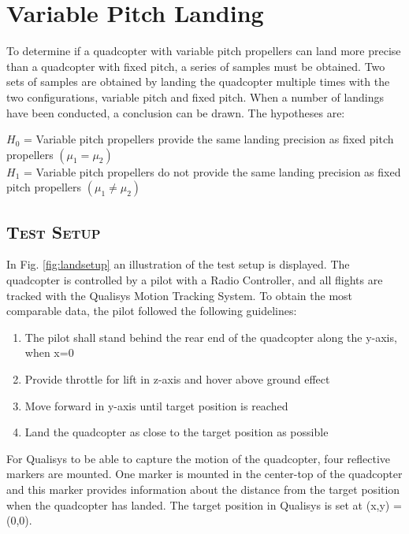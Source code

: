 \section{Variable Pitch Landing}
\label{sec:landtest}
To determine if a quadcopter with variable pitch propellers can land more precise than a quadcopter with fixed pitch, a series of samples must be obtained. Two sets of samples are obtained by landing the quadcopter multiple times with the two configurations, variable pitch and fixed pitch. When a number of landings have been conducted, a conclusion can be drawn. The hypotheses are:\bigskip

$H_0$ = Variable pitch propellers provide the same landing precision as fixed pitch propellers $(\mu_1 = \mu_2 )$\\
$H_1$ = Variable pitch propellers do not provide the same landing precision as fixed pitch propellers $(\mu_1 \neq \mu_2 )$\\

\subsection{\textsc{\medium Test Setup}}
In Fig. \ref{fig:landsetup} an illustration of the test setup is displayed. The quadcopter is controlled by a pilot with a Radio Controller, and all flights are tracked with the Qualisys Motion Tracking System. To obtain the most comparable data, the pilot followed the following guidelines:
\begin{enumerate}
  \item The pilot shall stand behind the rear end of the quadcopter along the y-axis, when x=0
  \item Provide throttle for lift in z-axis and hover above ground effect
  \item Move forward in y-axis until target position is reached
  \item Land the quadcopter as close to the target position as possible
\end{enumerate}\bigskip

For Qualisys to be able to capture the motion of the quadcopter, four reflective markers are mounted. One marker is mounted in the center-top of the quadcopter and this marker provides information about the distance from the target position when the quadcopter has landed. The target position in Qualisys is set at (x,y) = (0,0).

